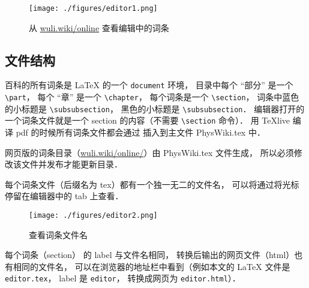 \begin{figure}[ht]
\centering
\texttt{[image: ./figures/editor1.png]}
\caption{从 \href{http://wuli.wiki/online}{wuli.wiki/online} 查看编辑中的词条} \label{editor_fig1}
\end{figure}

\subsection{文件结构}

百科的所有词条是 LaTeX 的一个 \lstinline|document| 环境， 目录中每个 “部分” 是一个 \lstinline|\part|， 每个 “章” 是一个 \lstinline|\chapter|， 每个词条是一个 \lstinline|\section|， 词条中蓝色的小标题是 \lstinline|\subsubsection|， 黑色的小标题是 \lstinline|\subsubsection|． 编辑器打开的一个词条文件就是一个 section 的内容（不需要 \lstinline|\section| 命令）． 用 TeXlive 编译 pdf 的时候所有词条文件都会通过 \lstinline|| 插入到主文件 PhysWiki.tex 中．

网页版的词条目录（\href{http://wuli.wiki/online/}{wuli.wiki/online/}）由 PhysWiki.tex 文件生成， 所以必须修改该文件并发布才能更新目录．

每个词条文件（后缀名为 tex）都有一个独一无二的文件名， 可以将通过将光标停留在编辑器中的 tab 上查看．

\begin{figure}[ht]
\centering
\texttt{[image: ./figures/editor2.png]}
\caption{查看词条文件名} \label{editor_fig2}
\end{figure}

每个词条（section） 的 label 与文件名相同， 转换后输出的网页文件（html）也有相同的文件名， 可以在浏览器的地址栏中看到（例如本文的 LaTeX 文件是 \lstinline|editor.tex|， label 是 \lstinline|editor|， 转换成网页为 \lstinline|editor.html|）．

